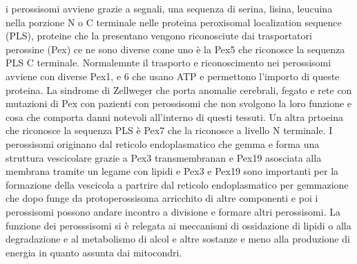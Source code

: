 i perossisomi avviene grazie a segnali, una sequenza di serina, lisina, leucuina nella porzione N o C terminale nelle proteina peroxisomal localization sequence (PLS), proteine che la
presentano vengono riconosciute dai trasportatori perossine (Pex) ce ne sono diverse come uno \`e la Pex5 che riconosce la sequenza PLS C terminale. Normalemnte il trasporto e 
riconoscimento nei perossisomi avviene con diverse Pex1, e 6 che usano ATP e permettono l'importo di queste proteina. La sindrome di Zellweger che porta anomalie cerebrali, fegato e rete
con mutazioni di Pex con pazienti con perossisomi che non svolgono la loro funzione e cosa che comporta danni notevoli all'interno di questi tessuti. Un altra prtoeina che riconosce la 
sequenza PLS \`e Pex7 che la riconosce a livello N terminale. I perossisomi originano dal reticolo endoplasmatico che gemma e forma una struttura vescicolare grazie a Pex3 transmembranan
e Pex19 asosciata alla membrana tramite un legame con lipidi e Pex3 e Pex19 sono importanti per la formazione della vescicola a partrire dal reticolo endoplasmatico per gemmazione che
dopo funge da protoperossisoma arricchito di altre componenti e poi i perossisomi possono andare incontro a divisione e formare altri perossisomi. La funzione dei perosssisomi si \`e 
relegata ai meccanismi di ossidazione di lipidi o alla degradazione e al metabolismo di alcol e altre sostanze e meno alla produzione di energia in quanto assunta dai mitocondri. 
